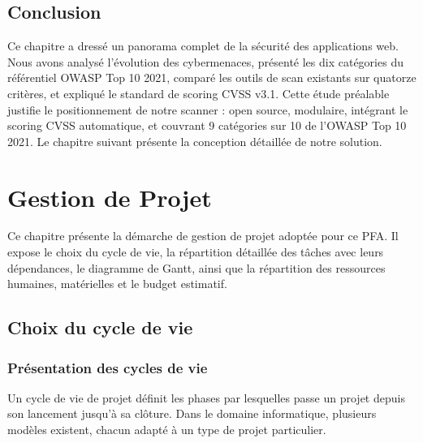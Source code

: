 \documentclass[12pt,a4paper]{report}
\begin{document}
\section{Conclusion}

Ce chapitre a dressé un panorama complet de la sécurité des applications web. Nous avons
analysé l'évolution des cybermenaces, présenté les dix catégories du référentiel OWASP Top 10
2021, comparé les outils de scan existants sur quatorze critères, et expliqué le standard de
scoring CVSS v3.1. Cette étude préalable justifie le positionnement de notre scanner :
open source, modulaire, intégrant le scoring CVSS automatique, et couvrant 9 catégories sur
10 de l'OWASP Top 10 2021. Le chapitre suivant présente la conception détaillée de notre
solution.

\chapter{Gestion de Projet}

Ce chapitre présente la démarche de gestion de projet adoptée pour ce PFA. Il expose
le choix du cycle de vie, la répartition détaillée des tâches avec leurs dépendances, le
diagramme de Gantt, ainsi que la répartition des
ressources humaines, matérielles et le budget estimatif.

\section{Choix du cycle de vie}

\subsection{Présentation des cycles de vie}

Un cycle de vie de projet définit les phases par lesquelles passe un projet depuis son
lancement jusqu'à sa clôture. Dans le domaine informatique, plusieurs modèles existent,
chacun adapté à un type de projet particulier.
\end{document}
